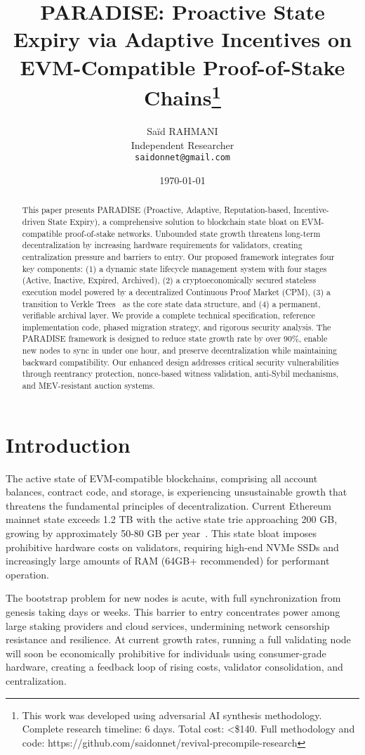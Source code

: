 \documentclass{article}
\title{PARADISE: Proactive State Expiry via Adaptive Incentives on EVM-Compatible Proof-of-Stake Chains\thanks{This work was developed using adversarial AI synthesis methodology. Complete research timeline: 6 days. Total cost: <\$140. Full methodology and code: https://github.com/saidonnet/revival-precompile-research}}
\author{
  Saïd RAHMANI \\
  Independent Researcher \\
  \texttt{saidonnet@gmail.com}
}
\date{\today}
\begin{document}
\maketitle

\begin{abstract}
This paper presents PARADISE (Proactive, Adaptive, Reputation-based, Incentive-driven State Expiry), a comprehensive solution to blockchain state bloat on EVM-compatible proof-of-stake networks. Unbounded state growth threatens long-term decentralization by increasing hardware requirements for validators, creating centralization pressure and barriers to entry. Our proposed framework integrates four key components: (1) a dynamic state lifecycle management system with four stages (Active, Inactive, Expired, Archived), (2) a cryptoeconomically secured stateless execution model powered by a decentralized Continuous Proof Market (CPM), (3) a transition to Verkle Trees~\cite{kuszmaul2018,buterin2021verkle} as the core state data structure, and (4) a permanent, verifiable archival layer. We provide a complete technical specification, reference implementation code, phased migration strategy, and rigorous security analysis. The PARADISE framework is designed to reduce state growth rate by over 90\%, enable new nodes to sync in under one hour, and preserve decentralization while maintaining backward compatibility. Our enhanced design addresses critical security vulnerabilities through reentrancy protection, nonce-based witness validation, anti-Sybil mechanisms, and MEV-resistant auction systems.
\end{abstract}

\section{Introduction}

The active state of EVM-compatible blockchains, comprising all account balances, contract code, and storage, is experiencing unsustainable growth that threatens the fundamental principles of decentralization. Current Ethereum mainnet state exceeds 1.2 TB with the active state trie approaching 200 GB, growing by approximately 50-80 GB per year~\cite{konstantopoulos2024stategrowth}. This state bloat imposes prohibitive hardware costs on validators, requiring high-end NVMe SSDs and increasingly large amounts of RAM (64GB+ recommended) for performant operation.

The bootstrap problem for new nodes is acute, with full synchronization from genesis taking days or weeks. This barrier to entry concentrates power among large staking providers and cloud services, undermining network censorship resistance and resilience. At current growth rates, running a full validating node will soon be economically prohibitive for individuals using consumer-grade hardware, creating a feedback loop of rising costs, validator consolidation, and centralization.
\end{document}
